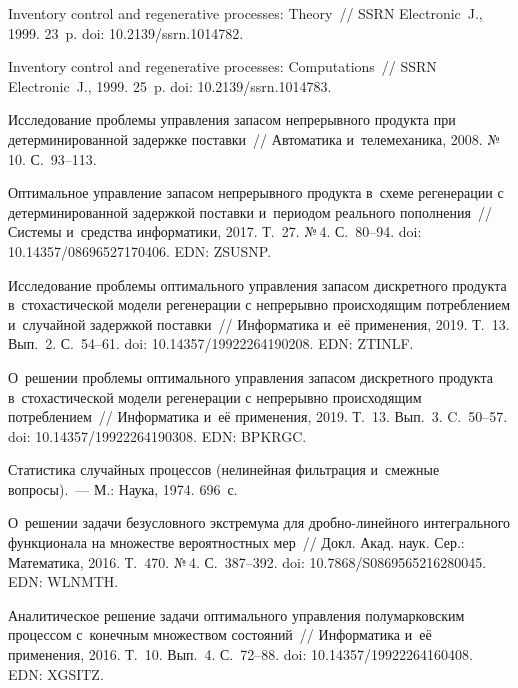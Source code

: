 \begin{multicols}{2}
{{\begin{thebibliography}{99}
  Inventory 
control and regenerative processes: Theory~// SSRN Electronic~J., 1999. 
23~p. doi: 10.2139/ssrn.1014782.

  Inventory 
control and regenerative processes: Computations~// SSRN Electronic~J., 
1999. 25~p. doi: 10.2139/ssrn.1014783.


 Исследование проб\-ле\-мы 
управ\-ле\-ния запасом непрерывного продукта при детерминированной задержке по\-став\-ки~//  Автоматика и~телемеханика, 2008. №\,10. С.~93--113.

 Оптимальное 
управ\-ле\-ние запасом непрерывного продукта в~схеме регенерации с детерминированной 
за\-держ\-кой по\-став\-ки и~периодом реального пополнения~//  Системы и~средства 
информатики, 2017. Т.~27. №\,4. С.~80--94. doi: 10.14357/08696527170406. EDN: ZSUSNP.

 Исследование проб\-ле\-мы 
оптимального управ\-ле\-ния запасом дискретного продукта в~стохастической модели 
регенерации с непрерывно происходящим по\-треб\-ле\-ни\-ем и~случайной за\-держ\-кой 
по\-став\-ки~//  Информатика и~её применения, 2019. Т.~13. Вып.~2.  С.~54--61. doi: 10.14357/19922264190208. EDN: ZTINLF.

  О~решении проблемы 
оптимального управления запасом дискретного продукта в~стохастической модели 
регенерации с непрерывно происходящим потреблением~//  Информатика и~её 
применения, 2019. Т.~13. Вып.~3. C.~50--57.  doi: 10.14357/19922264190308. EDN: BPKRGC.
 

 Статистика случайных 
процессов (нелинейная фильтрация и~смежные вопросы).~--- М.: Наука, 1974. 696~с.

 О~решении задачи безусловного экстремума 
для дроб\-но-ли\-ней\-но\-го интегрального функционала на множестве вероятностных мер~//  Докл. Акад. наук. Сер.: Математика, 2016. Т.~470. №\,4. С.~387--392.
 doi: 10.7868/S0869565216280045. EDN: WLNMTH.
 

 


Аналитическое решение задачи оптимального управления полумарковским процессом 
с~конечным множеством состояний~//  Информатика и~её применения, 2016. Т.~10. 
Вып.~4.  С.~72--88. doi: 10.14357/19922264160408. EDN: XGSITZ.
\end{thebibliography}

 }
 }

\end{multicols}


